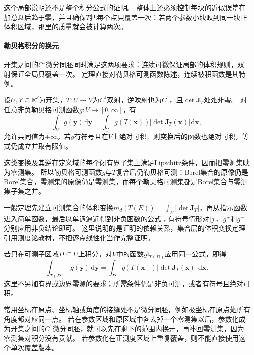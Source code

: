 这个局部说明还不是整个积分公式的证明。
整体上还必须控制每块的近似误差在加总以后趋于零，并且确保$T$把每个点只覆盖一次：若两个参数小块映到同一块正体积区域，那里的质量就会被计算两次。

\paragraph{勒贝格积分的换元}

开集之间的$C^1$微分同胚同时满足这两项要求：连续可微保证局部的体积规则，双射保证全局只覆盖一次。
定理直接对勒贝格可测函数陈述，连续被积函数是其特例。
\begin{theorem}[区域积分的换元公式]
设$U,V\subseteq\mathbb R^d$为开集，$T:U\to V$为$C^1$双射，逆映射也为$C^1$，且$\det\bm J_T$处处非零。
对任意非负勒贝格可测函数$g:V\to[0,\infty]$，有
\begin{equation}
 \int_Vg(\bm y)\,\mathrm d\bm y
 =\int_Ug(T(\bm x))|\det\bm J_T(\bm x)|\,\mathrm d\bm x,
 \label{eq:measurable-change-variables}
\end{equation}
允许共同值为$+\infty$。若$g$有符号且在$V$上绝对可积，则变换后的函数也绝对可积，等式仍成立并取有限值。
\end{theorem}

这类变换及其逆在定义域的每个闭有界子集上满足Lipschitz条件，因而把零测集映为零测集。
所以勒贝格可测函数$g$与$T$复合后仍勒贝格可测：Borel集合的原像仍是Borel集合，零测集的原像仍是零测集，而每个勒贝格可测集都是Borel集合与零测集子集之并。

一般定理先建立可测集合的体积变换$m_d(T(E))=\int_E|\det\bm J_T|$，再从指示函数进入简单函数，最后以单调逼近得到非负函数的公式；有符号情形对$|g|$、$g^+$和$g^-$分别应用非负结论即可。
这里说明的是证明的依赖关系，集合层的体积变换定理引用测度论教材，不把逐点线性化当作完整证明。

若只在可测子区域$D\subseteq U$上积分，对$V$中的函数$g\mathbb I_{T(D)}$应用同一公式，即得
\begin{equation}
 \int_{T(D)}g(\bm y)\,\mathrm d\bm y
 =\int_Dg(T(\bm x))|\det\bm J_T(\bm x)|\,\mathrm d\bm x.
 \label{eq:analysis-multivariate-change-variables}
\end{equation}
这里不另加有界或边界零测的要求；所需条件仍是非负可测，或者有符号且绝对可积。

常用坐标在原点、坐标轴或角度的接缝处不是微分同胚，例如极坐标在原点处所有角度都对应同一点。
若在参数区域和原区域中各去掉一个零测集以后，参数化成为开集之间的$C^1$微分同胚，就可以先在剩下的范围内换元，再补回零测集，因为零测集对积分没有贡献。
若参数化在正测度区域上重复覆盖，则不能直接使用这个单次覆盖版本。

